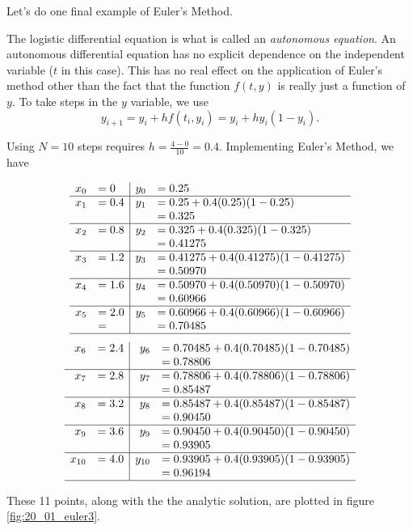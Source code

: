 Let's do one final example of Euler's Method.\\

{The logistic differential equation is what is called an \emph{autonomous equation}.  An autonomous differential equation  has no explicit dependence on the independent variable ($t$ in this case).  This has no real effect on the application of Euler's method other than the fact that the function $f(t,y)$ is really just a function of $y$.  To take steps in the $y$ variable, we use
\[y_{i+1} = y_i + hf(t_i,y_i) = y_i + hy_i(1-y_i).\]

Using $N=10$ steps requires $\displaystyle h = \frac{4-0}{10} = 0.4.$  Implementing Euler's Method, we have

\[
\begin{array}{rl | rl}
x_0  &= 0			& 	y_0	&= 0.25\\ \hline
x_1 	&= 0.4		&	y_1 	&= 0.25 + 0.4(0.25)(1-0.25)\\
	&			&		&= 0.325\\ \hline
x_2 	&= 0.8 		& 	y_2 	&= 0.325 + 0.4(0.325)(1-0.325)\\
	&			&		&= 0.41275\\ \hline
x_3	&= 1.2		&	y_3 	&= 0.41275 + 0.4(0.41275)(1-0.41275)\\
	&			&		&= 0.50970\\ \hline
x_4	&= 1.6		&	y_4	&= 0.50970 + 0.4(0.50970)(1 - 0.50970)\\
	&			&		&= 0.60966\\ \hline
x_5  &= 2.0		& 	y_5	&= 0.60966 + 0.4(0.60966)(1-0.60966)\\
	&=			&		&=  0.70485\\ \hline
\end{array}
\]
\[
\begin{array}{rl | rl}
x_6 	&= 2.4		&	y_6 	&= 0.70485 + 0.4(0.70485)(1 - 0.70485)\\
	&			&		&= 0.78806\\ \hline
x_7 	&= 2.8 		& 	y_7 	&= 0.78806 + 0.4(0.78806)(1-0.78806)\\
	&			&		&= 0.85487\\ \hline
x_8	&= 3.2		&	y_8 	&= 0.85487 + 0.4(0.85487)(1-0.85487)\\
	&			&		&= 0.90450\\ \hline
x_9	&= 3.6		&	y_9	&= 0.90450 + 0.4(0.90450)(1 - 0.90450)\\
	&			&		&= 0.93905\\ \hline
x_{10}&= 4.0		&	y_{10}&= 0.93905 + 0.4(0.93905)(1 - 0.93905)\\
	&			&		&= 0.96194\\ \hline
\end{array}
\]

These 11 points, along with the  the analytic solution, are plotted in figure \ref{fig:20_01_euler3}.
}\\

